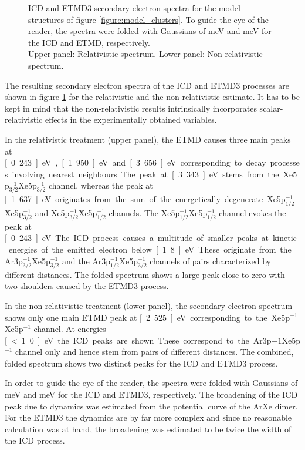 \begin{figure}[]
 \centering
 
 
 \caption{\ac{ICD} and \ac{ETMD}3 secondary electron spectra for the model
          structures of figure \ref{figure:model_clusters}. To guide the
          eye of the reader, the spectra
          were folded with Gaussians of \unit[300]{meV} and \unit[600]{meV}
          for the \ac{ICD} and \ac{ETMD}, respectively.\\
          Upper panel: Relativistic spectrum. Lower panel: Non-relativistic
          spectrum.}
 \label{figure:arxe_model}
\end{figure}

The resulting secondary electron spectra of the \ac{ICD} and
\ac{ETMD}3 processes are shown in figure \ref{figure:arxe_model} for the
relativistic and the non-relativistic estimate.
It has to be kept in mind that the non-relativistic results intrinsically
incorporates scalar-relativistic effects in the experimentally obtained variables.

In the relativistic treatment (upper panel), the \ac{ETMD} causes three main
peaks at \unit[0.243]{eV}, \unit[1.950]{eV} and \unit[3.656]{eV}
corresponding to decay
processes involving nearest neighbours. The peak at \unit[3.343]{eV} stems
from the Xe5p$_{3/2}^{-1}$Xe5p$_{3/2}^{-1}$ channel, whereas the peak
at \unit[1.637]{eV} originates from the sum of the energetically degenerate
Xe5p$_{1/2}^{-1}$Xe5p$_{3/2}^{-1}$ and Xe5p$_{3/2}^{-1}$Xe5p$_{1/2}^{-1}$
channels. The Xe5p$_{1/2}^{-1}$Xe5p$_{1/2}^{-1}$ channel evokes the peak
at \unit[0.243]{eV}.
The \ac{ICD} process causes a multitude of smaller peaks at kinetic
energies of the emitted electron below \unit[1.8]{eV}. These originate from the
Ar3p$_{3/2}^{-1}$Xe5p$_{3/2}^{-1}$ and the Ar3p$_{1/2}^{-1}$Xe5p$_{3/2}^{-1}$
channels of pairs characterized by different distances.
The folded spectrum shows a large peak close to zero with two shoulders
caused by the \ac{ETMD}3 process.

In the non-relativistic treatment (lower panel), the secondary
electron spectrum shows only one main \ac{ETMD} peak at \unit[2.525]{eV}
corresponding to the Xe5p$^{-1}$Xe5p$^{-1}$ channel.
At energies \unit[<1.0]{eV} the \ac{ICD} peaks are shown. These correspond
to the Ar3p${-1}$Xe5p$^{-1}$ channel only and hence stem from pairs of
different distances.
The combined, folded spectrum shows two distinct peaks for the \ac{ICD} and
\ac{ETMD}3 process.

In order to guide the eye of the reader, the spectra were folded with
Gaussians of \unit[300]{meV} and \unit[600]{meV}
for the ICD and ETMD3, respectively. The broadening of the ICD peak due
to dynamics was estimated from the potential curve of the ArXe dimer. For
the ETMD3 the dynamics are by far more complex and since no reasonable
calculation was at hand, the broadening was estimated to be twice the width
of the ICD process.

